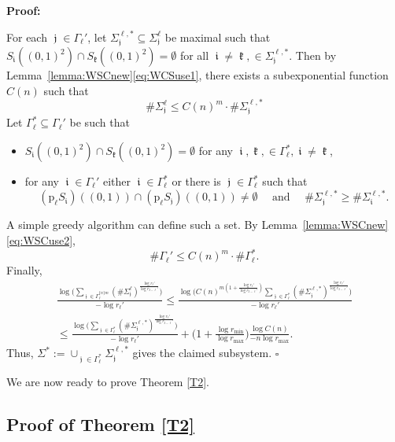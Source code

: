 \documentclass[a4paper, 11pt]{article}
\newenvironment{Proof}{\noindent \textbf{Proof:}}{\hfill$\square$\\}
\DeclareMathOperator{\iii}{\mathfrak{i}}
\DeclareMathOperator{\jjj}{\mathfrak{j}}
\DeclareMathOperator{\kkk}{\mathfrak{k}}
\numberwithin{equation}{section}
\theoremstyle{plain}
\theoremstyle{remark}
\theoremstyle{definition}
\begin{document}
\begin{Proof}

For each $\jjj \in \Gamma_\ell'$, let $\Sigma_{\jjj}^{\ell,*} \subseteq \Sigma_{\jjj}^{\ell}$ be maximal such that $S_{\iii}((0,1)^2) \cap S_{\kkk}((0,1)^2) = \emptyset$ for all $\iii\neq \kkk, \in\Sigma_{\jjj}^{\ell,*}$.  Then by Lemma~\ref{lemma:WSCnew}\eqref{eq:WCSuse1}, there exists a subexponential function $C(n)$ such that
\[  \# \Sigma_{\jjj}^{\ell} \leq C(n)^{m} \cdot \# \Sigma_{\jjj}^{\ell,*}\]
Let $\Gamma_\ell^* \subseteq \Gamma_\ell'$ be such that 
\begin{itemize}
\item $S_{\iii}((0,1)^2) \cap S_{\kkk}((0,1)^2) = \emptyset$ for any $\iii, \kkk, \in \Gamma_\ell^*, \iii \neq \kkk$, 
\item for any $\iii \in \Gamma_\ell'$ either $\iii \in \Gamma_\ell^*$ or there is $\jjj \in \Gamma_\ell^*$ such that 
\[
(\mathrm{p}_\ell S_{\iii})((0,1)) \cap (\mathrm{p}_\ell S_{\jjj})((0,1)) \neq \emptyset \quad \text{ and } \quad \#\Sigma_{\jjj}^{\ell,*} \geq \#\Sigma_{\iii}^{\ell,*}.
\]
\end{itemize}
A simple greedy algorithm can define such a set. By Lemma~\ref{lemma:WSCnew}\eqref{eq:WSCuse2},
\[ \#\Gamma_\ell' \leq C(n)^{m} \cdot \#\Gamma_\ell^* .\]
Finally,
\begin{multline*}
\frac{\log \bigg(\sum\limits_{\jjj\in\Gamma_{\ell}^{\{n\}m}}(\#\Sigma_{\jjj}^\ell )^{\frac{\log r_\ell'}{\log r_{3-\ell}'}}\bigg)}{-\log r_\ell'} \leq  \frac{\log \bigg(C(n)^{m(1+\frac{\log r_\ell'}{\log r_{3-\ell}'})}\sum\limits_{\jjj\in\Gamma_{\ell}^*} (\#\Sigma_{\jjj}^{\ell,*} )^{\frac{\log r_\ell'}{\log r_{3-\ell}'}}\bigg)}{-\log r_\ell'} \\
\leq \frac{\log \bigg(\sum\limits_{\jjj\in\Gamma_{\ell}^*} (\#\Sigma_{\jjj}^{\ell,*} )^{\frac{\log r_\ell'}{\log r_{3-\ell}'}}\bigg)}{-\log r_\ell'} + \Big(1+\frac{\log r_{\min}}{\log r_{\max}}\Big)\frac{\log C(n)}{-n\log r_{\max}}.
\end{multline*}
Thus, $\Sigma^* := \cup_{\jjj \in \Gamma_\ell^*} \Sigma_{\jjj}^{\ell,*}$ gives the claimed subsystem.
\end{Proof}

We are now ready to prove Theorem \ref{T2}.

\subsection{Proof of Theorem \ref{T2}}
\end{document}
